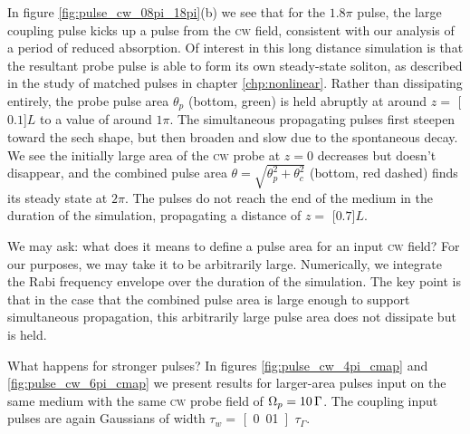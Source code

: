     In figure \ref{fig:pulse_cw_08pi_18pi}(b) we see that for the $1.8 \pi$
    pulse, the large coupling pulse kicks up a pulse from the \textsc{cw} field,
    consistent with our analysis of a period of reduced absorption. Of interest
    in this long distance simulation is that the resultant probe pulse is able
    to form its own steady-state soliton, as described in the study of matched
    pulses in chapter \ref{chp:nonlinear}. Rather than dissipating entirely, the
    probe pulse area $\theta_p$ (bottom, green) is held abruptly at around $z =
    $ \unit[$0.1$]{$L$} to a value of around $1 \pi$. The simultaneous
    propagating pulses first steepen toward the sech shape, but then broaden and
    slow due to the spontaneous decay. We see the initially large area of the
    \textsc{cw} probe at $z = 0$ decreases but doesn't disappear, and the
    combined pulse area $\theta = \sqrt{\theta_p^2 + \theta_c^2}$ (bottom, red
    dashed) finds its steady state at $2 \pi$. The pulses do not reach the end
    of the medium in the duration of the simulation, propagating a distance of
    $z = $ \unit[$0.7$]{$L$}.

    We may ask: what does it means to define a pulse area for an input
    \textsc{cw} field? For our purposes, we may take it to be arbitrarily large.
    Numerically, we integrate the Rabi frequency envelope over the duration of
    the simulation. The key point is that in the case that the combined pulse
    area is large enough to support simultaneous propagation, this arbitrarily
    large pulse area does not dissipate but is held.

    What happens for stronger pulses? In figures \ref{fig:pulse_cw_4pi_cmap} and
    \ref{fig:pulse_cw_6pi_cmap} we present results for larger-area pulses input
    on the same medium with the same \textsc{cw} probe field of $\Omega_p =
    \unit[10]{\Gamma}$. The coupling input pulses are again Gaussians of width
    $\tau_w = $ \unit[0.01]{$\tau_\Gamma$}.

